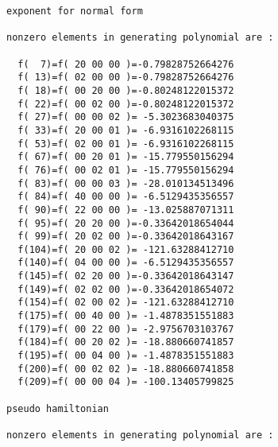 \begin{footnotesize}
\begin{verbatim}
exponent for normal form

nonzero elements in generating polynomial are :

  f(  7)=f( 20 00 00 )=-0.79828752664276
  f( 13)=f( 02 00 00 )=-0.79828752664276
  f( 18)=f( 00 20 00 )=-0.80248122015372
  f( 22)=f( 00 02 00 )=-0.80248122015372
  f( 27)=f( 00 00 02 )= -5.3023683040375
  f( 33)=f( 20 00 01 )= -6.9316102268115
  f( 53)=f( 02 00 01 )= -6.9316102268115
  f( 67)=f( 00 20 01 )= -15.779550156294
  f( 76)=f( 00 02 01 )= -15.779550156294
  f( 83)=f( 00 00 03 )= -28.010134513496
  f( 84)=f( 40 00 00 )= -6.5129435356557
  f( 90)=f( 22 00 00 )= -13.025887071311
  f( 95)=f( 20 20 00 )=-0.33642018654044
  f( 99)=f( 20 02 00 )=-0.33642018643167
  f(104)=f( 20 00 02 )= -121.63288412710
  f(140)=f( 04 00 00 )= -6.5129435356557
  f(145)=f( 02 20 00 )=-0.33642018643147
  f(149)=f( 02 02 00 )=-0.33642018654072
  f(154)=f( 02 00 02 )= -121.63288412710
  f(175)=f( 00 40 00 )= -1.4878351551883
  f(179)=f( 00 22 00 )= -2.9756703103767
  f(184)=f( 00 20 02 )= -18.880660741857
  f(195)=f( 00 04 00 )= -1.4878351551883
  f(200)=f( 00 02 02 )= -18.880660741858
  f(209)=f( 00 00 04 )= -100.13405799825

pseudo hamiltonian

nonzero elements in generating polynomial are :


\end{verbatim}
\end{footnotesize}
